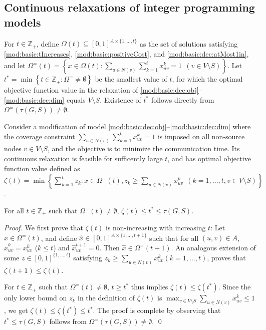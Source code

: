 \subsection{Continuous relaxations of integer programming models} \label{sec:lblprel}

For $t\in\mathbb{Z}_+$, define $\Omega(t)\subseteq[0,1]^{A\times\{1,\ldots,t\}}$ as the set of solutions satisfying
\eqref{mod:basic:tIncreases}, \eqref{mod:basic:positiveCost}, and \eqref{mod:basic:dec:atMost1in},
and let $\Omega^=(t) = \left\{x\in\Omega(t): \sum\limits_{u \in N(v)} \sum\limits_{k=1}^tx_{uv}^k = 1 ~~(v\in V\setminus S)\right\}$.
Let $t^{\ast}=\min\left\{t\in\mathbb{Z}_+: \Omega^=\neq\emptyset\right\}$ be the smallest value of $t$, for which the optimal objective function value in
the relaxation of \eqref{mod:basic:dec:obj}--\eqref{mod:basic:dec:dim} equals $V\setminus S$.
Existence of $t^{\ast}$ follows directly from $\Omega^=\left(\tau(G,S)\right)\neq\emptyset$.

Consider a modification of model \eqref{mod:basic:dec:obj}--\eqref{mod:basic:dec:dim} where the coverage constraint
$\sum\limits_{u \in N(v)} \sum\limits_{k=1}^tx_{uv}^k = 1$ is imposed on all non-source nodes $v\in V\setminus S$, and the objective is to minimize the communication time.
Its continuous relaxation is feasible for sufficently large $t$, and has optimal objective function value defined as
$\zeta(t)=\min\left\{\sum\limits_{k=1}^tz_k: x\in\Omega^=(t), z_k\geq\sum\limits_{u \in N(v)}x_{uv}^k ~~(k=1,\ldots,t, v\in V\setminus S)\right\}$.

\begin{proposition} \label{prop:lpweak}
For all $t\in\mathbb{Z}_+$ such that $\Omega^=(t)\neq\emptyset$, $\zeta(t)\leq t^{\ast}\leq\tau(G,S)$.
\end{proposition}
\begin{proof}
We first prove that $\zeta(t)$ is non-increasing with increasing $t$: Let $x\in\Omega^=(t)$, and define $\hat{x}\in[0,1]^{A\times\{1,\ldots,t+1\}}$ such that
for all $(u,v)\in A$, $\hat{x}_{uv}^k=x_{uv}^k$ ($k\leq t$) and $\hat{x}_{uv}^{t+1}=0$.
Then $\hat{x}\in\Omega^=(t+1)$.
An analogous extension of some $z\in[0,1]^{\{1,\ldots,t\}}$ satisfying $z_k\geq\sum\limits_{u \in N(v)}x_{uv}^k (k=1,\ldots,t)$, proves that $\zeta(t+1)\leq\zeta(t)$.

For $t\in\mathbb{Z}_+$ such that $\Omega^=(t)\neq\emptyset$, $t\geq t^{\ast}$ thus implies $\zeta(t)\leq\zeta(t^{\ast})$.
Since the only lower bound on $z_k$ in the definition of $\zeta(t)$ is $\max_{v\in V\setminus S}\sum\limits_{u \in N(v)}x_{uv}^k\leq 1$,
we get $\zeta(t)\leq\zeta(t^{\ast})\leq t^{\ast}$.
The proof is complete by observing that $t^{\ast}\leq\tau(G,S)$ follows from $\Omega^=\left(\tau(G,S)\right)\neq\emptyset$.
\qed
\end{proof}

